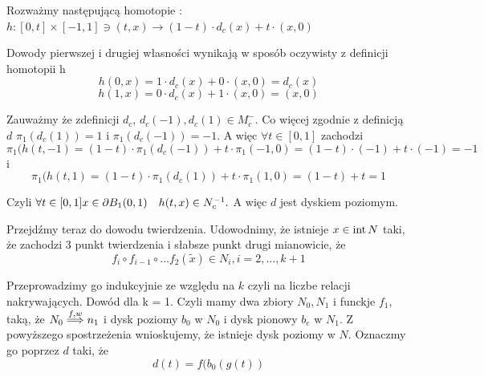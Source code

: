 Rozważmy następującą homotopie : 
$h:[0,t]\times [-1,1] \ni (t,x) \to (1-t) \cdot d_c(x) + t\cdot (x,0) $

Dowody pierwszej i drugiej własności wynikają w sposób oczywisty z definicji homotopii h
$$ h(0,x) = 1 \cdot d_c(x) + 0 \cdot (x,0) = d_c(x) $$
$$ h(1,x) = 0 \cdot d_c(x) + 1 \cdot (x,0) = (x,0) $$

Zauważmy że zdefinicji $d_c $, $d_c(-1),d_c(1)\in M^-_c $. Co więcej zgodnie z definicją $ d $ 
$\pi_1(d_c(1)) = 1 $ i $\pi_1(d_c(-1)) = -1 $. A więc $ \forall t \in [0,1] $ zachodzi
$$
 \pi_1( h(t,-1) = (1-t) \cdot \pi_1(d_c(-1)) + t \cdot \pi_1(-1,0) = (1- t) \cdot (-1) + t \cdot (-1) = -1 
$$
i 
$$
  \pi_1( h(t,1) = (1-t) \cdot \pi_1(d_c(1)) + t \cdot \pi_1(1,0) = (1- t) + t = 1
$$

Czyli $ \forall t \in [0,1] x \in \partial B_1(0,1) \quad h(t,x) \in N^{-1}_c.$ 
A więc $ d $ jest dyskiem poziomym.

Przejdźmy teraz do dowodu twierdzenia. 
Udowodnimy, że istnieje $ x \in {\rm int}\, N $ taki, że zachodzi 3 punkt twierdzenia i słabsze punkt 
drugi mianowicie, że 
\begin{equation}
  f_i \circ f_{i-1} \circ \dots f_2(\tilde{x}) \in N_i , i = 2,...,k+1
\end{equation}

Przeprowadzimy go indukcyjnie ze względu na $k$ czyli na liczbe relacji nakrywających.
Dowód dla k = 1.
Czyli mamy dwa zbiory $N_0,N_1$ i funckje $f_1$, taką, że $ N_0 \stackrel{f,w}{\Longrightarrow} n_1$ i 
dysk poziomy $ b_0 $ w $ N_0$ i dysk pionowy $b_e$ w $ N_1 $.
Z powyższego spostrzeżenia wnioskujemy, że istnieje dysk poziomy w $ N $. Oznaczmy 
go poprzez $ d $ taki, że 
$$
  d(t) = f(b_0(g(t))
$$

